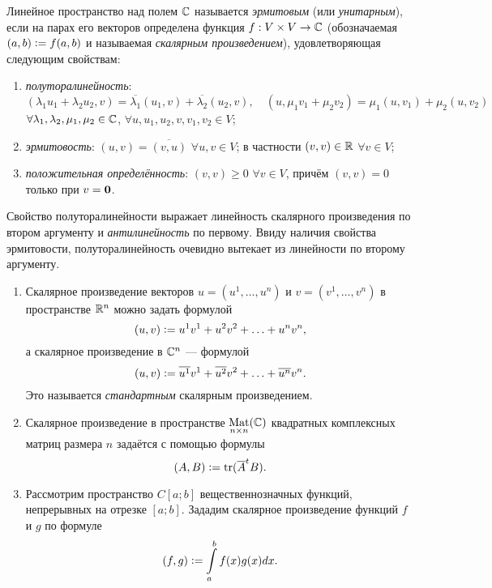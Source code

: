 \begin{definition}
    Линейное пространство над полем $\mathbb{C}$ называется \textit{эрмитовым} (или \textit{унитарным}), если на парах его векторов определена функция $f: V \times V \to \mathbb{C}$ (обозначаемая $(a, b) \vcentcolon = f(a, b)$ и называемая \textit{скалярным произведением}), удовлетворяющая следующим свойствам:
    \begin{enumerate}[nolistsep]
        \item \textit{полуторалинейность}:
            \[
                (\lambda_1u_1 + \lambda_2u_2, v) = \overline{\lambda_1}(u_1, v) + \overline{\lambda_2}(u_2, v),\quad(u, \mu_1v_1 + \mu_2v_2) = \mu_1(u, v_1) + \mu_2(u, v_2)
            \]
            $\forall \lambda_1, \lambda_2, \mu_1, \mu_2 \in \mathbb{C}$, $\forall u, u_1, u_2, v, v_1, v_2 \in V$;
        \item \textit{эрмитовость}: $(u, v) = \overline{(v, u)}$ $\forall u, v \in V$; в частности $(v, v) \in \mathbb{R}$ $\forall v \in V$;
        \item \textit{положительная определённость}: $(v, v) \geqslant 0$ $\forall v \in V$, причём $(v, v) = 0$ только при $v = \boldsymbol{0}$.
    \end{enumerate}
\end{definition}

Свойство полуторалинейности выражает линейность скалярного произведения по втором аргументу и \textit{антилинейность} по первому. Ввиду наличия свойства эрмитовости, полуторалинейность очевидно вытекает из линейности по второму аргументу.

\begin{example}
    \begin{enumerate}[nolistsep]
        \item Скалярное произведение векторов $u = (u^1, \ldots, u^n)$ и $v = (v^1, \ldots, v^n)$ в пространстве $\mathbb{R}^n$ можно задать формулой
            \[
                (u, v) \vcentcolon = u^1v^1 + u^2v^2 + \ldots + u^nv^n,
            \]
            а скалярное произведение в $\mathbb{C}^n$ --- формулой
            \[
                (u, v) \vcentcolon = \overline{u^1}v^1 + \overline{u^2}v^2 + \ldots + \overline{u^n}v^n.
            \]
            Это называется \textit{стандартным} скалярным произведением.
        \item Скалярное произведение в пространстве $\underset{n \times n}{\operatorname{Mat}}(\mathbb{C})$ квадратных комплексных матриц размера $n$ задаётся с помощью формулы
            \[
                (A, B) \vcentcolon = \operatorname{tr}(\overline{A}^tB).
            \]
        \item Рассмотрим пространство $C[a; b]$ вещественнозначных функций, непрерывных на отрезке $[a; b]$. Зададим скалярное произведение функций $f$ и $g$ по формуле
            \[
                (f, g) \vcentcolon = \int\limits_a^bf(x)g(x)dx.
            \]
    \end{enumerate}
\end{example}

